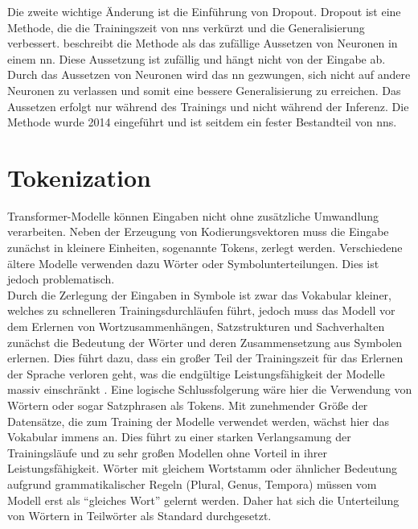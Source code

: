 Die zweite wichtige Änderung ist die Einführung von Dropout. 
Dropout ist eine Methode, die die Trainingszeit von \ac{nn}s verkürzt und die Generalisierung verbessert. 
\citet{dropout} beschreibt die Methode als das zufällige Aussetzen von Neuronen in einem \ac{nn}. 
Diese Aussetzung ist zufällig und hängt nicht von der Eingabe ab. 
Durch das Aussetzen von Neuronen wird das \ac{nn} gezwungen, sich nicht auf andere Neuronen zu verlassen und somit eine bessere Generalisierung zu erreichen. 
Das Aussetzen erfolgt nur während des Trainings und nicht während der Inferenz. 
Die Methode wurde 2014 eingeführt und ist seitdem ein fester Bestandteil von \ac{nn}s.\\

\section{Tokenization}\label{sec:tokenization}
Transformer-Modelle können Eingaben nicht ohne zusätzliche Umwandlung verarbeiten.
Neben der Erzeugung von Kodierungsvektoren muss die Eingabe zunächst in kleinere Einheiten, sogenannte Tokens, zerlegt werden.
Verschiedene ältere Modelle verwenden dazu Wörter oder Symbolunterteilungen.
Dies ist jedoch problematisch.\\

Durch die Zerlegung der Eingaben in Symbole ist zwar das Vokabular kleiner, welches zu schnelleren Trainingsdurchläufen führt, jedoch muss das Modell vor dem Erlernen von Wortzusammenhängen, Satzstrukturen und Sachverhalten zunächst die Bedeutung der Wörter und deren Zusammensetzung aus Symbolen erlernen.
Dies führt dazu, dass ein großer Teil der Trainingszeit für das Erlernen der Sprache verloren geht, was die endgültige Leistungsfähigkeit der Modelle massiv einschränkt \citep{bpe}.
Eine logische Schlussfolgerung wäre hier die Verwendung von Wörtern oder sogar Satzphrasen als Tokens.
Mit zunehmender Größe der Datensätze, die zum Training der Modelle verwendet werden, wächst hier das Vokabular immens an.
Dies führt zu einer starken Verlangsamung der Trainingsläufe und zu sehr großen Modellen ohne Vorteil in ihrer Leistungsfähigkeit.
Wörter mit gleichem Wortstamm oder ähnlicher Bedeutung aufgrund grammatikalischer Regeln (Plural, Genus, Tempora) müssen vom Modell erst als \enquote{gleiches Wort} gelernt werden.
Daher hat sich die Unterteilung von Wörtern in Teilwörter als Standard durchgesetzt.

